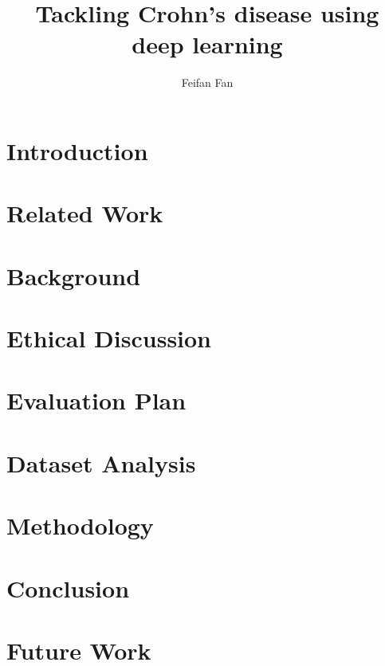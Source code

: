 \documentclass[a4paper,12pt]{report}
\begin{document}
\title{Tackling Crohn's disease using deep learning}
\author{Feifan Fan}





\tableofcontents
\listoffigures

\chapter{Introduction}


\chapter{Related Work}

\chapter{Background}
\label{cha:background}


\chapter{Ethical Discussion}


\chapter{Evaluation Plan}
\label{cha:Evaluation-plan}


\chapter{Dataset Analysis}

\chapter{Methodology}
\label{cha:Methodology}


\chapter{Conclusion}
\label{cha:Conclusion}


\chapter{Future Work}


\end{document}
